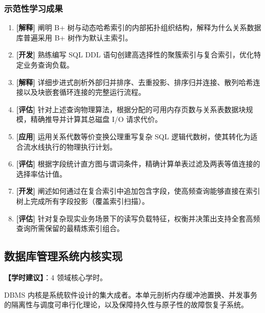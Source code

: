 \subsubsection{示范性学习成果}
\begin{enumerate}
    \item \textbf{[解释]} 阐明 B+ 树与动态哈希索引的内部拓扑组织结构，解释为什么关系数据库普遍采用 B+ 树作为默认主索引。
    \item \textbf{[开发]} 熟练编写 SQL DDL 语句创建高选择性的聚簇索引与复合索引，优化特定业务查询负载。
    \item \textbf{[解释]} 详细步进式剖析外部归并排序、去重投影、排序归并连接、散列哈希连接以及块嵌套循环连接的完整运行流程。
    \item \textbf{[评估]} 针对上述查询物理算法，根据分配的可用内存页数与关系表数据块规模，精确推导并计算其总磁盘 I/O 请求代价。
    \item \textbf{[应用]} 运用关系代数等价变换公理重写复杂 SQL 逻辑代数树，使其转化为适合流水线执行的物理执行计划。
    \item \textbf{[评估]} 根据字段统计直方图与谓词条件，精确计算单表过滤及两表等值连接的选择率估计值。
    \item \textbf{[开发]} 阐述如何通过在复合索引中追加包含字段，使高频查询能够直接在索引树上完成所有字段投影（覆盖索引扫描）。
    \item \textbf{[评估]} 针对复杂现实业务场景下的读写负载特征，权衡并决策出支持全套高频查询所需保留的最精炼索引组合。
\end{enumerate}

\subsection{数据库管理系统内核实现}
\textbf{【学时建议】}：4 领域核心学时。

DBMS 内核是系统软件设计的集大成者。本单元剖析内存缓冲池置换、并发事务的隔离性与调度可串行化理论，以及保障持久性与原子性的故障恢复子系统。

